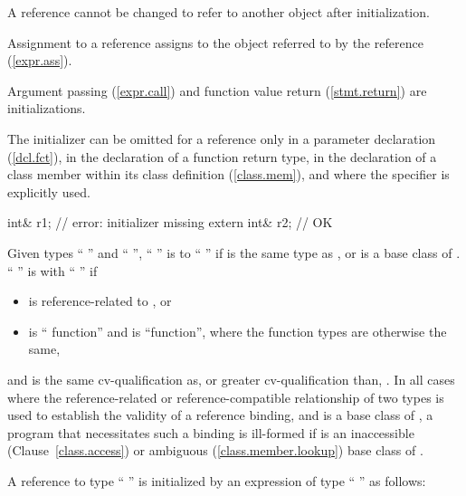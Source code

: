 \pnum
A reference cannot be changed to refer to another object after initialization.
%
\begin{note}
Assignment to a reference assigns to the object referred to by the reference (\ref{expr.ass}).
\end{note}
%
Argument passing (\ref{expr.call})
%
and function value return (\ref{stmt.return}) are initializations.

\pnum
The initializer can be omitted for a reference only in a parameter declaration
(\ref{dcl.fct}), in the declaration of a function return type, in the declaration of
a class member within its class definition (\ref{class.mem}), and where the
specifier is explicitly used.
%
\begin{example}

\begin{codeblock}
int& r1;                        // error: initializer missing
extern int& r2;                 // OK
\end{codeblock}
\end{example}

\pnum
Given types `` '' and `` '',
`` '' is  to
`` '' if
 is the same type as , or
 is a base class of .
`` '' is 
with `` '' if
\begin{itemize}
\item {} is reference-related to , or
\item {} is `` function'' and  is ``function'',
where the function types are otherwise the same,
\end{itemize}
and
is the same cv-qualification as, or greater cv-qualification than,
.
In all cases where the reference-related or reference-compatible relationship
of two types is used to establish the validity of a reference binding, and
is a base class of
,
a program that necessitates such a binding is ill-formed if
is an inaccessible (Clause~\ref{class.access}) or ambiguous (\ref{class.member.lookup})
base class of
.

\pnum
A reference to type `` '' is initialized by
an expression of type `` '' as follows:%

